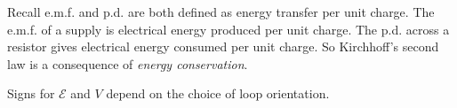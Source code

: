 \documentclass[a4paper,12pt]{book}
\begin{document}
Recall e.m.f. and p.d. are both defined as energy transfer per unit charge. The e.m.f. of a supply is electrical energy produced per unit charge. The p.d. across a resistor gives electrical energy consumed per unit charge.
So Kirchhoff's second law is a consequence of \emph{energy conservation}.

Signs for $\mathcal{E}$ and $V$ depend on the choice of loop orientation.


\end{document}
